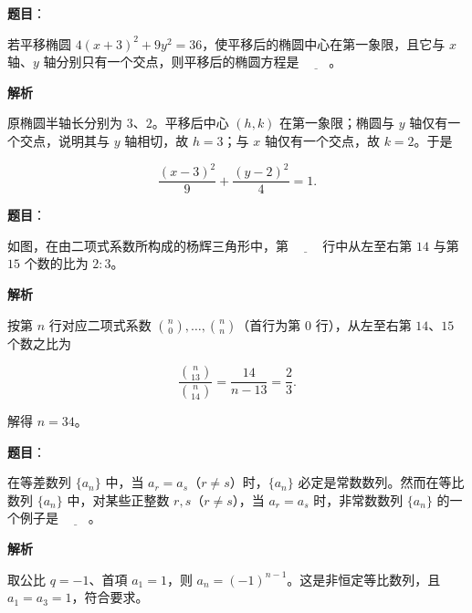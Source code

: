 \begin{answer}

\textbf{题目}：

若平移椭圆 $4(x+3)^2+9y^2=36$，使平移后的椭圆中心在第一象限，且它与 $x$ 轴、$y$ 轴分别只有一个交点，则平移后的椭圆方程是 $\underline{\qquad}$。

\textbf{解析}

原椭圆半轴长分别为 $3$、$2$。平移后中心 $(h,k)$ 在第一象限；椭圆与 $y$ 轴仅有一个交点，说明其与 $y$ 轴相切，故 $h=3$；与 $x$ 轴仅有一个交点，故 $k=2$。于是

\nopagebreak[4]
\[\frac{(x-3)^2}{9}+\frac{(y-2)^2}{4}=1.\]


\end{answer}
\begin{answer}

\textbf{题目}：

如图，在由二项式系数所构成的杨辉三角形中，第 $\underline{\qquad}$ 行中从左至右第 $14$ 与第 $15$ 个数的比为 $2:3$。
\nopagebreak[4]
\begin{center}\end{center}
\nopagebreak[4]
\textbf{解析}

按第 $n$ 行对应二项式系数 $\binom n0,\ldots,\binom nn$（首行为第 $0$ 行），从左至右第 $14$、$15$ 个数之比为

\nopagebreak[4]
\[\frac{\binom n{13}}{\binom n{14}}=\frac{14}{n-13}=\frac23.\]

解得 $n=34$。


\end{answer}
\begin{answer}

\textbf{题目}：

在等差数列 $\{a_n\}$ 中，当 $a_r=a_s$（$r\ne s$）时，$\{a_n\}$ 必定是常数数列。然而在等比数列 $\{a_n\}$ 中，对某些正整数 $r,s$（$r\ne s$），当 $a_r=a_s$ 时，非常数数列 $\{a_n\}$ 的一个例子是 $\underline{\qquad}$。

\textbf{解析}

取公比 $q=-1$、首項 $a_1=1$，则 $a_n=(-1)^{n-1}$。这是非恒定等比数列，且 $a_1=a_3=1$，符合要求。


\end{answer}

